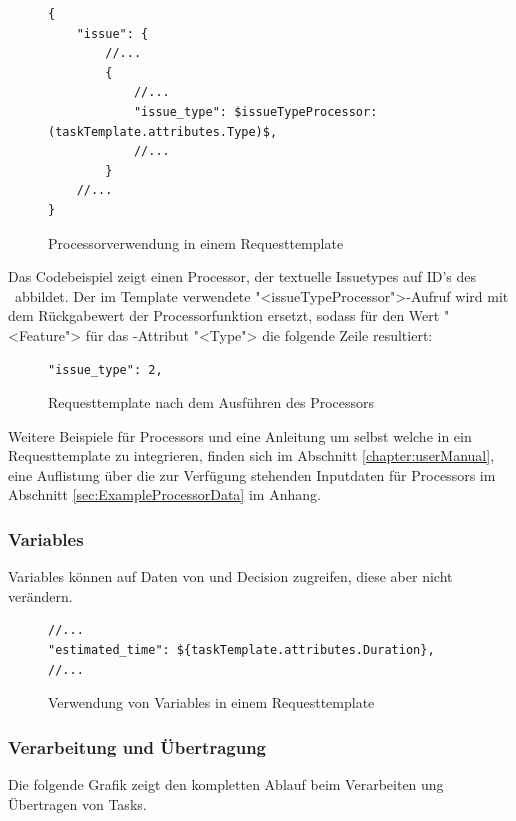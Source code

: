 			\begin{figure}[H]
				\begin{lstlisting}
{
	"issue": {
		//...
		{
			//...
			"issue_type": $issueTypeProcessor:(taskTemplate.attributes.Type)$,
			//...
		}
	//...
}
				\end{lstlisting}
				\centering
				\caption{Processorverwendung in einem Requesttemplate}
				\label{fig:processorUsageInRequestTemplate}
			\end{figure}
			
			Das Codebeispiel zeigt einen Processor, der textuelle Issuetypes auf ID's des \ppt\ abbildet.
			Der im Template verwendete "<issueTypeProcessor">-Aufruf wird mit dem Rückgabewert der Processorfunktion ersetzt, sodass für den Wert "<Feature"> für das \ttpl -Attribut "<Type"> 
			die folgende Zeile resultiert:
			
			\begin{figure}[H]
				\begin{lstlisting}
"issue_type": 2,
				\end{lstlisting}
				\centering
				\caption{Requesttemplate nach dem Ausführen des Processors}
				\label{fig:requestTemplateAfterProcessorCall}
			\end{figure}
			
			Weitere Beispiele für Processors und eine Anleitung um selbst welche in ein Requesttemplate zu integrieren,
			finden sich im Abschnitt \ref{chapter:userManual}, eine Auflistung über die zur Verfügung stehenden Inputdaten für Processors im Abschnitt \ref{sec:ExampleProcessorData} im Anhang.
			
			
			\subsubsection{Variables}
			Variables können auf Daten von \ttpl und Decision zugreifen,
			diese aber nicht verändern.
			
			\begin{figure}[H]
				\begin{lstlisting}
//...
"estimated_time": ${taskTemplate.attributes.Duration},
//...

				\end{lstlisting}
				\centering
				\caption{Verwendung von Variables in einem Requesttemplate}
				\label{fig:usageOfVariablesInRequestTemplates}
			\end{figure}
			
			
			\subsubsection{Verarbeitung und Übertragung}			
			Die folgende Grafik zeigt den kompletten Ablauf beim Verarbeiten ung Übertragen von Tasks.
			
